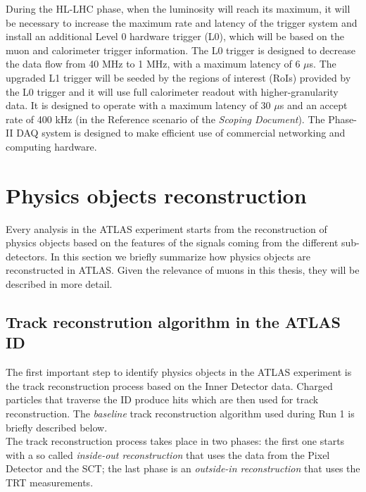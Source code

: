 \documentclass[a4paper,twoside,12pt]{book}
\begin{document}
During the HL-LHC phase, when the luminosity will reach its maximum, it will be necessary
to increase the maximum rate and latency of the trigger system and install an additional Level 0 hardware trigger (L0), which will be based on the muon and calorimeter trigger information. The L0 trigger is designed to decrease the data flow from 40 MHz to 1 MHz, with a maximum latency of 6 $\mu$s. The upgraded L1 trigger will be seeded by the regions of interest (RoIs) provided by the L0 
trigger and it will use full calorimeter readout with higher-granularity data. It is designed to
operate with a maximum latency of 30 $\mu$s and an accept rate of 400 kHz (in the Reference scenario of the \textit{Scoping Document}\cite{scoping}). The Phase-II DAQ system is designed to make 
efficient use of commercial networking and computing hardware. 

\clearpage


\chapter{Physics objects reconstruction}
Every analysis in the ATLAS experiment starts from the reconstruction of physics objects
based on the features of the signals coming from the different sub-detectors\cite{PhysicsObjectReconstruction}. In this section we briefly
summarize how physics objects are reconstructed in ATLAS. Given the relevance of muons in this thesis, they will be described in more detail.\\

\section{Track reconstrution algorithm in the ATLAS ID}
The first important step to identify physics objects in the ATLAS experiment is the track reconstruction process based on the Inner Detector data. Charged particles that
traverse the ID produce hits which are then used for track reconstruction. The \textit{baseline} track reconstruction
algorithm\cite{OptimizationTrackReconstructionAlgorithm} used during Run 1 is briefly described below.\\

The track reconstruction process takes place in two phases: the first one starts with a so called \textit{inside-out reconstruction} that uses the data from the Pixel Detector and the SCT; the last phase is an \textit{outside-in reconstruction} that uses the TRT measurements. \\
\end{document}
